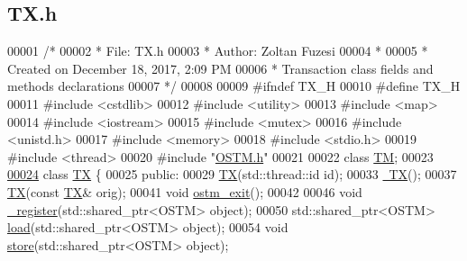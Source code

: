 \hypertarget{_t_x_8h_source}{}\subsection{T\+X.\+h}

\begin{DoxyCode}
00001 \textcolor{comment}{/* }
00002 \textcolor{comment}{ * File:   TX.h}
00003 \textcolor{comment}{ * Author: Zoltan Fuzesi}
00004 \textcolor{comment}{ * }
00005 \textcolor{comment}{ * Created on December 18, 2017, 2:09 PM}
00006 \textcolor{comment}{ * Transaction class fields and methods declarations}
00007 \textcolor{comment}{ */}
00008 
00009 \textcolor{preprocessor}{#ifndef TX\_H}
00010 \textcolor{preprocessor}{#define TX\_H}
00011 \textcolor{preprocessor}{#include <cstdlib>}
00012 \textcolor{preprocessor}{#include <utility>}
00013 \textcolor{preprocessor}{#include <map>}
00014 \textcolor{preprocessor}{#include <iostream>}
00015 \textcolor{preprocessor}{#include <mutex>}
00016 \textcolor{preprocessor}{#include <unistd.h>}
00017 \textcolor{preprocessor}{#include <memory>}
00018 \textcolor{preprocessor}{#include <stdio.h>}
00019 \textcolor{preprocessor}{#include <thread>}
00020 \textcolor{preprocessor}{#include "\hyperlink{_o_s_t_m_8h}{OSTM.h}"}
00021 
00022 \textcolor{keyword}{class }\hyperlink{class_t_m}{TM};
00023 
\hypertarget{_t_x_8h_source.tex_l00024}{}\hyperlink{class_t_x}{00024} \textcolor{keyword}{class }\hyperlink{class_t_x}{TX} \{
00025 \textcolor{keyword}{public}:
00029     \hyperlink{class_t_x_a8a4b83eab0171ae834bfa92bbced1094_a8a4b83eab0171ae834bfa92bbced1094}{TX}(std::thread::id \textcolor{keywordtype}{id});
00033     \hyperlink{class_t_x_abecf854cc3228ab6dd51175b3cd1c70a_abecf854cc3228ab6dd51175b3cd1c70a}{~TX}();
00037     \hyperlink{class_t_x_a8a4b83eab0171ae834bfa92bbced1094_a8a4b83eab0171ae834bfa92bbced1094}{TX}(\textcolor{keyword}{const} \hyperlink{class_t_x}{TX}& orig);
00041     \textcolor{keywordtype}{void} \hyperlink{class_t_x_aa9739c5c2077454c779098db7baefc2b_aa9739c5c2077454c779098db7baefc2b}{ostm\_exit}();
00042     
00046     \textcolor{keywordtype}{void} \hyperlink{class_t_x_abc32af2f51df97ac483e5bfe7db6ca6e_abc32af2f51df97ac483e5bfe7db6ca6e}{\_register}(std::shared\_ptr<OSTM>  \textcolor{keywordtype}{object});
00050     std::shared\_ptr<OSTM>  \hyperlink{class_t_x_a1d78262b8831ddd042ed491f2e600e24_a1d78262b8831ddd042ed491f2e600e24}{load}(std::shared\_ptr<OSTM>  \textcolor{keywordtype}{object});
00054     \textcolor{keywordtype}{void} \hyperlink{class_t_x_a7dbcb369aa4a3370b6c6829d278ece5d_a7dbcb369aa4a3370b6c6829d278ece5d}{store}(std::shared\_ptr<OSTM>  \textcolor{keywordtype}{object});

\end{DoxyCode}
